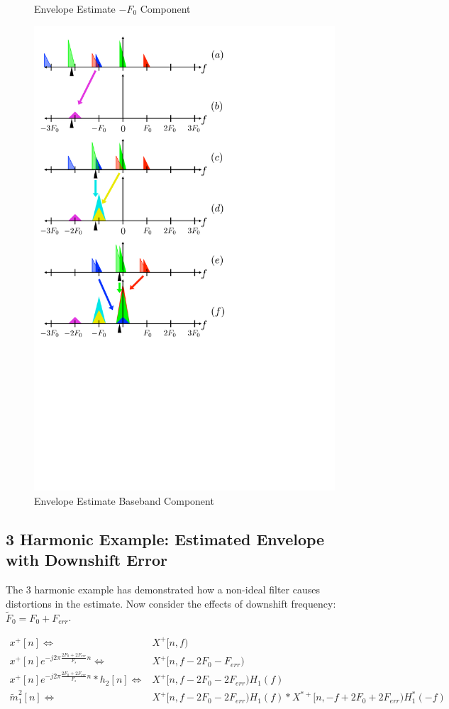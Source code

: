 \documentclass [11pt, proquest,oneside] {ganter_thesis}[2015/03/03]
\begin{document}
\begin{figure}[!ht]
    \caption{Envelope Estimate $-F_0$ Component}\label{fig:harmonic_envelope_F0}
    \includegraphics[width=.62\textwidth]{harmonic_envelope_0}
    \caption{Envelope Estimate Baseband Component}\label{fig:harmonic_envelope_0}
\end{figure}

\clearpage

\subsection{3 Harmonic Example: Estimated Envelope with Downshift Error}

The 3 harmonic example has demonstrated how a non-ideal filter causes distortions in the estimate.  Now consider the effects of downshift frequency: $\tilde{F}_0 = F_0 + F_{err}$.

\begin{align}
\label{eq:harmonic_estimate_ERR_fig_a}
x^+[n] \Longleftrightarrow& X^+[n,f) \\
%
x^+[n]e^{-j2\pi \frac{2F_0 + 2F_{err}}{F_s}n} \Longleftrightarrow& X^+[n,f - 2F_0 - F_{err}) \\
%
\label{eq:harmonic_estimate_ERR_fig_c}
x^+[n]e^{-j2\pi \frac{2F_0 + 2F_{err}}{F_s}n} * h_2[n] \Longleftrightarrow& X^+[n,f - 2F_0 - 2F_{err}) H_1(f) \\
%
\label{eq:harmonic_estimate_ERR_fig_e}
\tilde{m}_1^2[n] \Longleftrightarrow& X^+[n,f - 2F_0 - 2F_{err}) H_1(f) * X^{*+}[n,-f + 2F_0 + 2F_{err}) H_1^*(-f)
\end{align}
\end{document}
